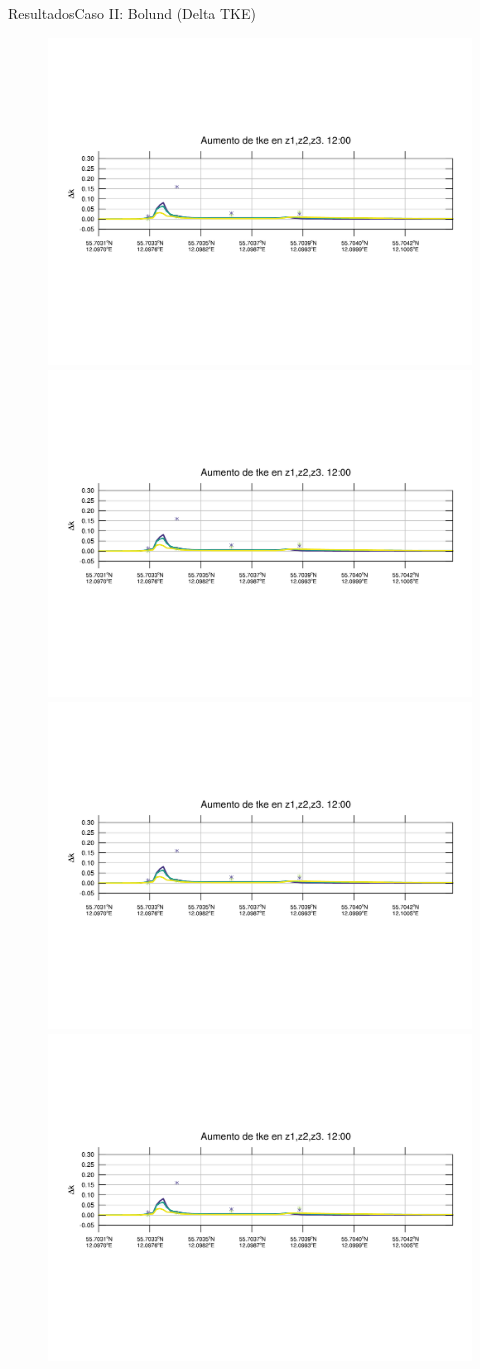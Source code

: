 \documentclass[mathserif,10pt]{beamer}
\begin{document}
\begin{frame}{Resultados}{Caso II: Bolund (Delta TKE)}
	\begin{figure}[H]
		\centering
		\includegraphics[width=0.65\linewidth,trim={12mm 84mm 10mm 74mm},page=1,clip]{fig/06/bol/delta_tke}\\%
		\includegraphics[width=0.65\linewidth,trim={12mm 84mm 10mm 74mm},page=13,clip]{fig/06/bol/delta_tke}\\%
		\includegraphics[width=0.65\linewidth,trim={12mm 84mm 10mm 74mm},page=25,clip]{fig/06/bol/delta_tke}\\%
		\includegraphics[width=0.65\linewidth,trim={12mm 84mm 10mm 74mm},page=37,clip]{fig/06/bol/delta_tke}\\%

\end{figure}
\end{frame}
\end{document}
